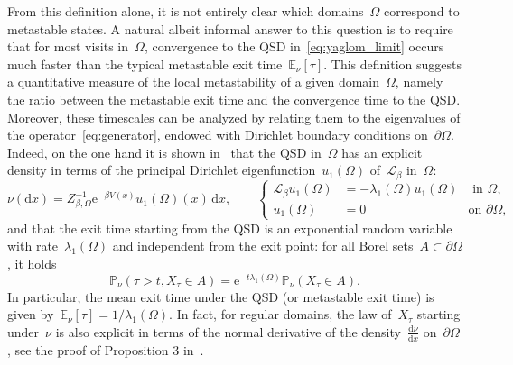 \documentclass[a4]{article}
\newcommand{\cL}{\mathcal{L}}
\renewcommand{\d}{\mathrm{d}}
\newcommand{\e}{\mathrm{e}}
\newcommand{\E}{\mathbb{E}}
\newcommand{\1}{\mathbbm 1}
\begin{document}
    From this definition alone, it is not entirely clear which domains~$\Omega$ correspond to metastable states.
    A natural albeit informal answer to this question is to require that for most visits in~$\Omega$, convergence to the QSD in~\eqref{eq:yaglom_limit} occurs much faster than the typical metastable exit time~$\E_\nu[\tau]$.
    This definition suggests a quantitative measure of the local metastability of a given domain~$\Omega$, namely the ratio between the metastable exit time and the convergence time to the QSD. Moreover, these timescales can be analyzed by relating them to the eigenvalues of the operator~\eqref{eq:generator}, endowed with Dirichlet boundary conditions on~$\partial\Omega$.
    Indeed, on the one hand it is shown in~\cite[Propositions 2 \& 3]{LBLLP12} that the QSD in~$\Omega$ has an explicit density in terms of the principal Dirichlet eigenfunction~$u_1(\Omega)$ of~$\cL_\beta$ in~$\Omega$:
    \begin{equation}
        \label{eq:qsd_spectral_link}
        \nu(\d x) = Z_{\beta,\Omega}^{-1}\e^{-\beta V(x)}u_{1}(\Omega)(x)\,\d x,\qquad\left\{\begin{aligned}\cL_\beta u_1(\Omega) &= -\lambda_1(\Omega)u_1(\Omega)&\text{ in $\Omega$}, \\ u_1(\Omega) &= 0&\text{on $\partial\Omega$},\end{aligned}\right.
    \end{equation}
    and that the exit time starting from the QSD is an exponential random variable with rate~$\lambda_1(\Omega)$ and independent from the exit point: for all Borel sets~$A\subset\partial\Omega$, it holds
    \begin{equation}
        \label{eq:exit_event}
        \mathbb P_\nu(\tau > t,X_{\tau}\in A) = \e^{-t\lambda_1(\Omega)}\mathbb P_\nu(X_\tau\in A).
    \end{equation}
    In particular, the mean exit time under the QSD (or metastable exit time) is given by~$\E_\nu[\tau] = 1/\lambda_1(\Omega)$.
    In fact, for regular domains, the law of~$X_\tau$ starting under~$\nu$ is also explicit in terms of the normal derivative of the density~$\frac{\d\nu}{\d x}$ on~$\partial\Omega$, see the proof of Proposition 3 in~\cite{LBLLP12}.
    
\end{document}
